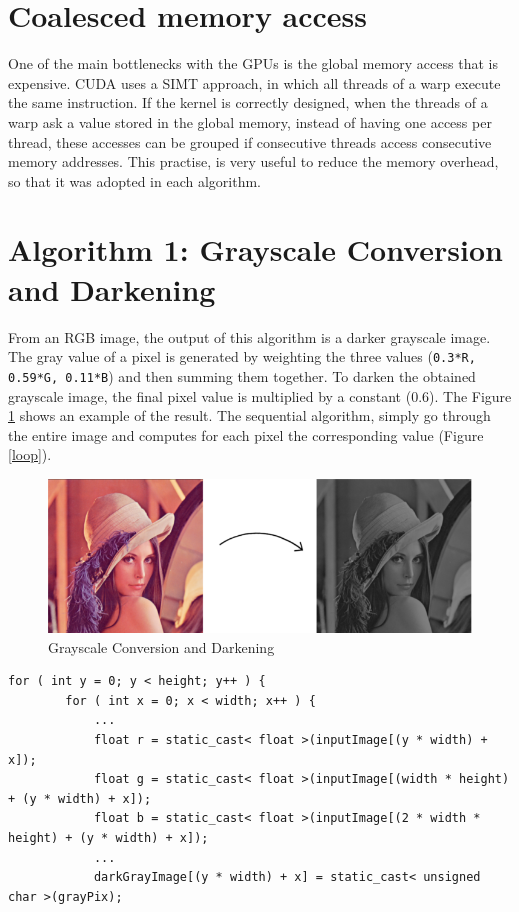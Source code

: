 \documentclass[a4paper]{article}
\begin{document}
\section{Coalesced memory access}
\label{sec:cma}
One of the main bottlenecks with the GPUs is the global memory access that is expensive. CUDA uses a SIMT approach, in which all threads of a warp execute the same instruction. If the kernel is correctly designed, when the threads of a warp ask a value stored in the global memory, instead of having one access per thread, these accesses can be grouped if consecutive threads access consecutive memory addresses. This practise, is very useful to reduce the memory overhead, so that it was adopted in each algorithm.


\section{Algorithm 1: Grayscale Conversion and Darkening}
\label{sec:gcd}
From an RGB image, the output of this algorithm is a darker grayscale image.
The gray value of a pixel is generated by weighting the three values (\texttt{0.3*R, 0.59*G, 0.11*B}) and then summing them together. To darken the obtained grayscale image, the final pixel value is multiplied by a constant (0.6). The Figure \ref{fig:dark} shows an example of the result. The sequential algorithm, simply go through the entire image and computes for each pixel the corresponding value (Figure \ref{loop}).

\begin{figure}[ht]
    \centering
    \includegraphics[width=\linewidth]{dark}
    \caption{Grayscale Conversion and Darkening}
    \label{fig:dark}
\end{figure}
\FloatBarrier

\begin{lstlisting}[label=loop, caption=Sequential code]
for ( int y = 0; y < height; y++ ) {
		for ( int x = 0; x < width; x++ ) {
			...
			float r = static_cast< float >(inputImage[(y * width) + x]);
			float g = static_cast< float >(inputImage[(width * height) + (y * width) + x]);
			float b = static_cast< float >(inputImage[(2 * width * height) + (y * width) + x]);
			...
			darkGrayImage[(y * width) + x] = static_cast< unsigned char >(grayPix);
\end{lstlisting}
\FloatBarrier
\end{document}
